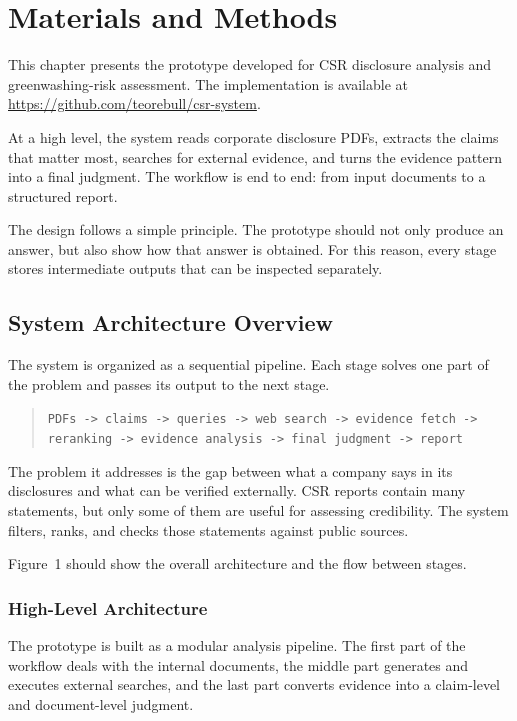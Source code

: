 \section{Materials and Methods}

This chapter presents the prototype developed for CSR disclosure analysis and greenwashing-risk assessment. The implementation is available at \url{https://github.com/teorebull/csr-system}.

At a high level, the system reads corporate disclosure PDFs, extracts the claims that matter most, searches for external evidence, and turns the evidence pattern into a final judgment. The workflow is end to end: from input documents to a structured report.

The design follows a simple principle. The prototype should not only produce an answer, but also show how that answer is obtained. For this reason, every stage stores intermediate outputs that can be inspected separately.

\subsection{System Architecture Overview}

The system is organized as a sequential pipeline. Each stage solves one part of the problem and passes its output to the next stage.

\begin{quote}
\texttt{PDFs -> claims -> queries -> web search -> evidence fetch -> reranking -> evidence analysis -> final judgment -> report}
\end{quote}

The problem it addresses is the gap between what a company says in its disclosures and what can be verified externally. CSR reports contain many statements, but only some of them are useful for assessing credibility. The system filters, ranks, and checks those statements against public sources.

Figure~1 should show the overall architecture and the flow between stages.

\subsubsection{High-Level Architecture}

The prototype is built as a modular analysis pipeline. The first part of the workflow deals with the internal documents, the middle part generates and executes external searches, and the last part converts evidence into a claim-level and document-level judgment.

